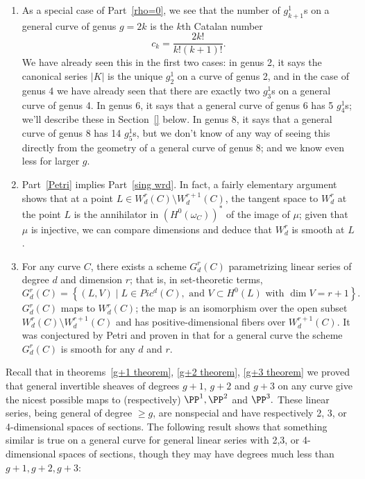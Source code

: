 \begin{remark}
\begin{enumerate}
\item As a special case of Part~\ref{rho=0}, we see that the number of $g^1_{k+1}$s on a general curve of genus $g = 2k$ is the $k$th Catalan number 
$$
c_k = \frac{2k!}{k!(k+1)!}.
$$
We have already seen this in the first two cases: in genus 2, it says the canonical series $|K|$ is the unique $g^1_2$ on a curve of genus 2, and in the case of genus 4 we have already seen  that there are exactly two $g^1_3$s on a general curve of genus 4. In genus 6, it says that a general curve of genus 6 has 5 $g^1_4$s; we'll describe these in Section~\ref{} below.  In genus 8, it says that a general curve of genus 8 has 14 $g^1_5$s, but we don't know of any way of seeing this directly from the geometry of a general curve of genus 8; and we know even less for larger $g$.

\item Part~\ref{Petri} implies Part~\ref{sing wrd}. In fact, a fairly elementary argument shows that at a point $L \in W^r_d(C) \setminus W^{r+1}_d(C)$, the tangent space to $W^r_d$ at the point $L$ is the annihilator
in $(H^0(\omega_C))^*$ of the image of $\mu$; given that $\mu$ is injective, we can compare dimensions and deduce that $W^r_d$ is smooth at $L$.

\item For any curve $C$, there exists a scheme $G^r_d(C)$ parametrizing linear series of degree $d$ and dimension $r$; that is, in set-theoretic terms,
$$
G^r_d(C) = \left\{ (L, V) \mid L \in Pic^d(C), \text{ and } V \subset H^0(L) \text{ with } \dim V = r+1 \right\}.
$$
$G^r_d(C)$ maps to $W^r_d(C)$; the map is an isomorphism over the open subset $W^r_d(C) \setminus W^{r+1}_d(C)$ and has positive-dimensional fibers over $W^{r+1}_d(C)$. It was conjectured
by Petri and proven in \cite{Gieseker-Petri} that for a general curve the scheme $G^r_d(C)$ is smooth for any $d$ and $r$.
\end{enumerate}
\end{remark}


Recall that  in theorems~\ref{g+1 theorem}, \ref{g+2 theorem}, \ref{g+3 theorem} we proved that
general invertible sheaves of degrees $g+1$, $g+2$ and $g+3$ on any curve
give the nicest possible maps to (respectively) $\PP^1, \PP^2$ and $\PP^3.$ These
linear series, being general of degree $\geq g$, are  nonspecial and have respectively
2, 3, or 4-dimensional spaces of sections. The following result shows that something
similar is true on a general curve for general linear series with 2,3, or 4-dimensional
spaces of sections, though they may have degrees much less than $g+1, g+2, g+3$:

